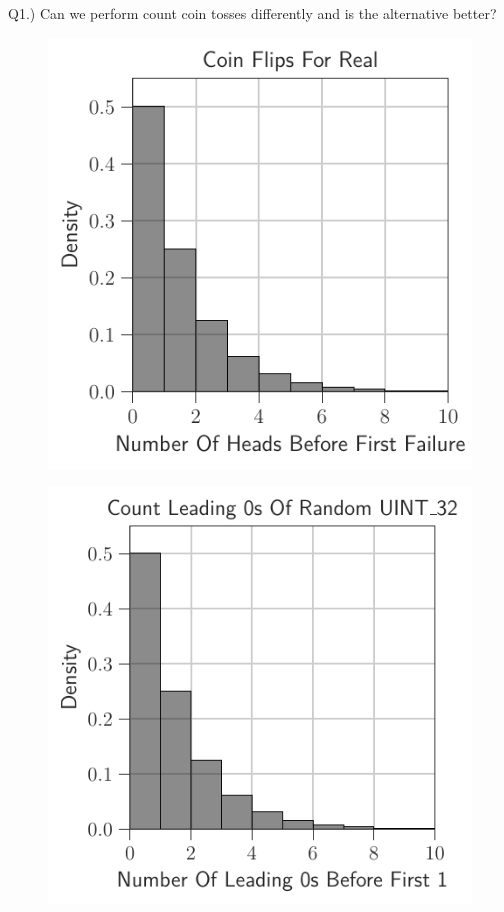 \documentclass[12pt]{article}
\begin{document}
Q1.) Can we perform count coin tosses differently and is the alternative better?

\begin{figure}[H]
	\centering
	\begin{minipage}{0.32\textwidth}
		\centering
		\includegraphics[width=\linewidth]{../notebook/coin_flips_for_real.pdf}
		\label{fig:coin_flips_for_real}
	\end{minipage}\hfill
	\begin{minipage}{0.32\textwidth}
		\centering
		\includegraphics[width=\linewidth]{../notebook/count_leading_0s_of_random_uint_32.pdf}

\end{minipage}
\end{figure}
\end{document}
